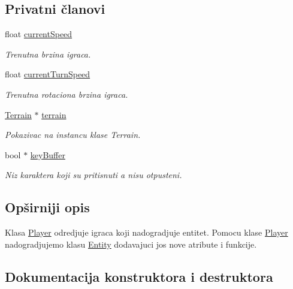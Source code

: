 \subsection*{Privatni članovi}
\begin{DoxyCompactItemize}
\item 
float \hyperlink{classentity_1_1Player_a06f0a95dc0b0efc3299a07f90e91dd25}{current\+Speed}
\begin{DoxyCompactList}\small\item\em Trenutna brzina igraca. \end{DoxyCompactList}\item 
float \hyperlink{classentity_1_1Player_afaac869e93409af86a6f6fc53a95687e}{current\+Turn\+Speed}
\begin{DoxyCompactList}\small\item\em Trenutna rotaciona brzina igraca. \end{DoxyCompactList}\item 
\hyperlink{classterrain_1_1Terrain}{Terrain} $\ast$ \hyperlink{classentity_1_1Player_adc298ca7a3d8ab3528440489ed4ea60e}{terrain}
\begin{DoxyCompactList}\small\item\em Pokazivac na instancu klase Terrain. \end{DoxyCompactList}\item 
bool $\ast$ \hyperlink{classentity_1_1Player_ad36623cb0c52ae4dc97d73cbf1cd2134}{key\+Buffer}
\begin{DoxyCompactList}\small\item\em Niz karaktera koji su pritisnuti a nisu otpusteni. \end{DoxyCompactList}\end{DoxyCompactItemize}


\subsection{Opširniji opis}
Klasa \hyperlink{classentity_1_1Player}{Player} odredjuje igraca koji nadogradjuje entitet. Pomocu klase \hyperlink{classentity_1_1Player}{Player} nadogradjujemo klasu \hyperlink{classentity_1_1Entity}{Entity} dodavajuci jos nove atribute i funkcije. 

\subsection{Dokumentacija konstruktora i destruktora}
\mbox{\label{classentity_1_1Player_a0edc8eeed60bf40c1ec63bb4f56a89ff}} 
